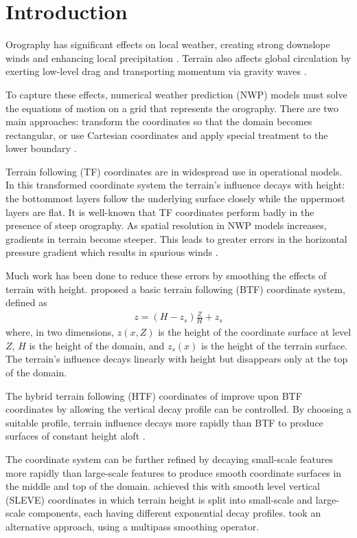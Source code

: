 \chapter{Introduction}

Orography has significant effects on local weather, creating strong downslope winds and enhancing local precipitation \autocite{barry2008}.  Terrain also affects global circulation by exerting low-level drag \autocite{lott-miller1997} and transporting momentum via gravity waves \autocite{mcfarlane1987}.

To capture these effects, numerical weather prediction (NWP) models must solve the equations of motion on a grid that represents the orography.  There are two main approaches: transform the coordinates so that the domain becomes rectangular, or use Cartesian coordinates and apply special treatment to the lower boundary \autocite{galchen-somerville1975}.

Terrain following (TF) coordinates are in widespread use in operational models.  In this transformed coordinate system the terrain's influence decays with height: the bottommost layers follow the underlying surface closely while the uppermost layers are flat.  It is well-known that TF coordinates perform badly in the presence of steep orography.  As spatial resolution in NWP models increases, gradients in terrain become steeper.  This leads to greater errors in the horizontal pressure gradient which results in spurious winds \autocite{dempsey-davis1998}.

Much work has been done to reduce these errors by smoothing the effects of terrain with height.  \cite{galchen-somerville1975} proposed a basic terrain following (BTF) coordinate system, defined as
\begin{align}
z = \left( H - z_s \right) \frac{Z}{H} + z_s
\end{align}
where, in two dimensions, $z(x, Z)$ is the height of the coordinate surface at level $Z$, $H$ is the height of the domain, and $z_s(x)$ is the height of the terrain surface.  The terrain's influence decays linearly with height but disappears only at the top of the domain.

The hybrid terrain following (HTF) coordinates of \cite{simmons-burridge1981} improve upon BTF coordinates by allowing the vertical decay profile can be controlled.  By choosing a suitable profile, terrain influence decays more rapidly than BTF to produce surfaces of constant height aloft \autocite{klemp2011}.

The coordinate system can be further refined by decaying small-scale features more rapidly than large-scale features to produce smooth coordinate surfaces in the middle and top of the domain.  \cite{schaer2002} achieved this with smooth level vertical (SLEVE) coordinates in which terrain height is split into small-scale and large-scale components, each having different exponential decay profiles.  \cite{klemp2011} took an alternative approach, using a multipass smoothing operator.

